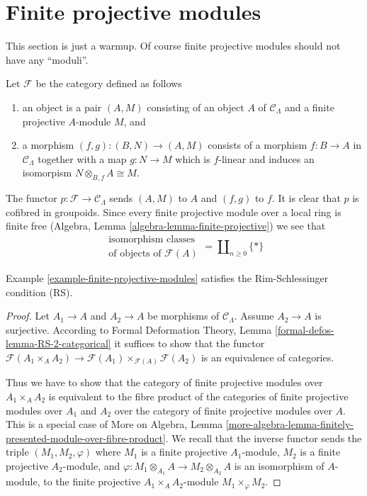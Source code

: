 \section{Finite projective modules}
\label{section-finite-projective-modules}

\noindent
This section is just a warmup. Of course finite projective modules
should not have any ``moduli''.

\begin{example}
\label{example-finite-projective-modules}
Let $\mathcal{F}$ be the category defined as follows
\begin{enumerate}
\item an object is a pair $(A, M)$ consisting of an
object $A$ of $\mathcal{C}_\Lambda$ and a
finite projective $A$-module $M$, and
\item a morphism $(f, g) : (B, N) \to (A, M)$ consists of
a morphism $f : B \to A$ in $\mathcal{C}_\Lambda$ together
with a map $g : N \to M$ which is $f$-linear and induces
an isomorpism $N \otimes_{B, f} A \cong M$.
\end{enumerate}
The functor $p : \mathcal{F} \to \mathcal{C}_\Lambda$ sends $(A, M)$ to $A$
and $(f, g)$ to $f$. It is clear that $p$ is cofibred in groupoids.
Since every finite projective module over a local ring is finite free
(Algebra, Lemma \ref{algebra-lemma-finite-projective})
we see that
$$
\begin{matrix}
\text{isomorphism classes} \\
\text{of objects of }\mathcal{F}(A)
\end{matrix}
= \coprod\nolimits_{n \geq 0} \{*\}
$$
\end{example}

\begin{lemma}
\label{lemma-finite-projective-modules-RS}
Example \ref{example-finite-projective-modules}
satisfies the Rim-Schlessinger condition (RS).
\end{lemma}

\begin{proof}
Let $A_1 \to A$ and $A_2 \to A$ be morphisms of $\mathcal{C}_\Lambda$.
Assume $A_2 \to A$ is surjective. According to
Formal Deformation Theory, Lemma
\ref{formal-defos-lemma-RS-2-categorical}
it suffices to show that the functor
$\mathcal{F}(A_1 \times_A A_2) \to
\mathcal{F}(A_1) \times_{\mathcal{F}(A)} \mathcal{F}(A_2)$
is an equivalence of categories.

\medskip\noindent
Thus we have to show that the category of finite projective modules
over $A_1 \times_A A_2$ is equivalent to the fibre product
of the categories of finite projective modules over $A_1$ and $A_2$
over the category of finite projective modules over $A$.
This is a special case of More on Algebra, Lemma
\ref{more-algebra-lemma-finitely-presented-module-over-fibre-product}.
We recall that the inverse functor sends the triple
$(M_1, M_2, \varphi)$ where
$M_1$ is a finite projective $A_1$-module,
$M_2$ is a finite projective $A_2$-module, and
$\varphi : M_1 \otimes_{A_1} A \to M_2 \otimes_{A_2} A$
is an isomorphism of $A$-module, to the finite projective
$A_1 \times_A A_2$-module $M_1 \times_\varphi M_2$.
\end{proof}

